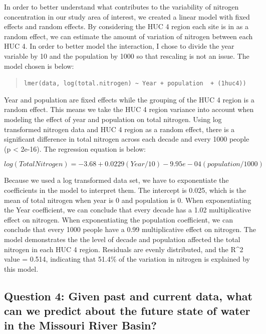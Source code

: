 \documentclass[12pt,]{article}
\begin{document}
In order to better understand what contributes to the variability of
nitrogen concentration in our study area of interest, we created a
linear model with fixed effects and random effects. By considering the
HUC 4 region each site is in as a random effect, we can estimate the
amount of variation of nitrogen between each HUC 4. In order to better
model the interaction, I chose to divide the year variable by 10 and the
population by 1000 so that rescaling is not an issue. The model chosen
is below:

\begin{quote}
\texttt{lmer(data,\ log(total.nitrogen)\ \textasciitilde{}\ Year\ +\ population\ \ +\ (1\textbar{}huc4))}
\end{quote}

Year and population are fixed effects while the grouping of the HUC 4
region is a random effect. This means we take the HUC 4 region variance
into account when modeling the effect of year and population on total
nitrogen. Using log transformed nitrogen data and HUC 4 region as a
random effect, there is a significant difference in total nitrogen
across each decade and every 1000 people (p \textless{} 2e-16). The
regression equation is below:

\[log(Total Nitrogen) = -3.68 + 0.0229(Year/10) - 9.95e-04(population/1000)\]

Because we used a log transformed data set, we have to exponentiate the
coefficients in the model to interpret them. The intercept is 0.025,
which is the mean of total nitrogen when year is 0 and population is 0.
When exponentiating the Year coefficient, we can conclude that every
decade has a 1.02 multiplicative effect on nitrogen. When exponentiating
the population coefficient, we can conclude that every 1000 people have
a 0.99 multiplicative effect on nitrogen. The model demonstrates the the
level of decade and population affected the total nitrogen in each HUC 4
region. Residuals are evenly distributed, and the R\^{}2 value = 0.514,
indicating that 51.4\% of the variation in nitrogen is explained by this
model.

\hypertarget{question-4-given-past-and-current-data-what-can-we-predict-about-the-future-state-of-water-in-the-missouri-river-basin}{%
\subsection{Question 4: Given past and current data, what can we predict
about the future state of water in the Missouri River
Basin?}\label{question-4-given-past-and-current-data-what-can-we-predict-about-the-future-state-of-water-in-the-missouri-river-basin}}
\end{document}
